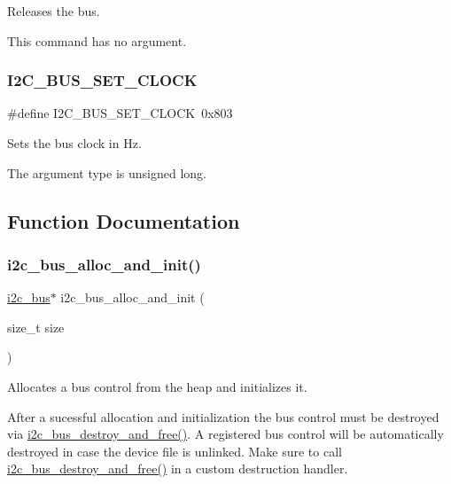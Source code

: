 Releases the bus. 

This command has no argument. \mbox{\label{group__I2CBus_gaa58f3eb1f3998bd0dd31db7768d4abcf}} 
\subsubsection{\texorpdfstring{I2C\_BUS\_SET\_CLOCK}{I2C\_BUS\_SET\_CLOCK}}
{\footnotesize\ttfamily \#define I2\+C\+\_\+\+B\+U\+S\+\_\+\+S\+E\+T\+\_\+\+C\+L\+O\+CK~0x803}



Sets the bus clock in Hz. 

The argument type is unsigned long. 

\subsection{Function Documentation}
\mbox{\label{group__I2CBus_gaf66a22612850bee468de351d1635f28a}} 
\subsubsection{\texorpdfstring{i2c\_bus\_alloc\_and\_init()}{i2c\_bus\_alloc\_and\_init()}}
{\footnotesize\ttfamily \mbox{\hyperlink{structi2c__bus}{i2c\+\_\+bus}}$\ast$ i2c\+\_\+bus\+\_\+alloc\+\_\+and\+\_\+init (\begin{DoxyParamCaption}\item[{size\+\_\+t}]{size }\end{DoxyParamCaption})}



Allocates a bus control from the heap and initializes it. 

After a sucessful allocation and initialization the bus control must be destroyed via \mbox{\hyperlink{group__I2CBus_ga174d189593676d0053ca88bc6edb238d}{i2c\+\_\+bus\+\_\+destroy\+\_\+and\+\_\+free()}}. A registered bus control will be automatically destroyed in case the device file is unlinked. Make sure to call \mbox{\hyperlink{group__I2CBus_ga174d189593676d0053ca88bc6edb238d}{i2c\+\_\+bus\+\_\+destroy\+\_\+and\+\_\+free()}} in a custom destruction handler.


